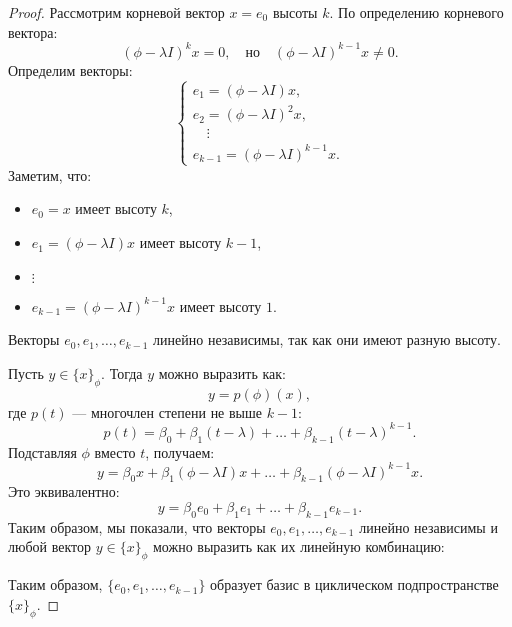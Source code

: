 \begin{proof}
    Рассмотрим корневой вектор \( x = e_0 \) высоты \( k \). По определению корневого вектора:
    \[
    (\phi - \lambda I)^k x = 0, \quad \text{но} \quad (\phi - \lambda I)^{k-1} x \neq 0.
    \]
    Определим векторы:
    \[
    \begin{cases}
        e_1 = (\phi - \lambda I) x, \\
        e_2 = (\phi - \lambda I)^2 x, \\
        \quad \vdots \\
        e_{k-1} = (\phi - \lambda I)^{k-1} x.
    \end{cases}
    \]
    Заметим, что:
    \begin{itemize}
        \item \( e_0 = x \) имеет высоту \( k \),
        \item \( e_1 = (\phi - \lambda I) x \) имеет высоту \( k-1 \),
        \item $\vdots$
        \item \( e_{k-1} = (\phi - \lambda I)^{k-1} x \) имеет высоту \( 1 \).
    \end{itemize}
    Векторы \( e_0, e_1, \ldots, e_{k-1} \) линейно независимы, так как они имеют разную высоту.

    Пусть \( y \in \{x\}_{\phi} \). Тогда \( y \) можно выразить как:
    \[
    y = p(\phi)(x),
    \]
    где \( p(t) \) — многочлен степени не выше \( k-1 \):
    \[
    p(t) = \beta_0 + \beta_1 (t - \lambda) + \ldots + \beta_{k-1} (t - \lambda)^{k-1}.
    \]
    Подставляя \( \phi \) вместо \( t \), получаем:
    \[
    y = \beta_0 x + \beta_1 (\phi - \lambda I) x + \ldots + \beta_{k-1} (\phi - \lambda I)^{k-1} x.
    \]
    Это эквивалентно:
    \[
    y = \beta_0 e_0 + \beta_1 e_1 + \ldots + \beta_{k-1} e_{k-1}.
    \]
    Таким образом, мы показали, что векторы \( e_0, e_1, \ldots, e_{k-1} \) линейно независимы и любой вектор \( y \in \{x\}_{\phi} \) можно выразить как их линейную комбинацию:

    Таким образом, \( \{e_0, e_1, \ldots, e_{k-1}\} \) образует базис в циклическом подпространстве \( \{x\}_{\phi} \).


\end{proof}
